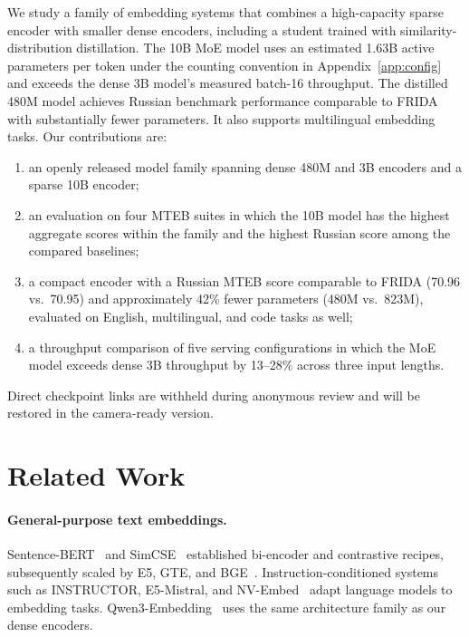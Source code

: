 \documentclass[11pt]{article}
\begin{document}
We study a family of embedding systems that combines a high-capacity sparse encoder with smaller dense encoders, including a student trained with similarity-distribution distillation.
The 10B MoE model uses an estimated 1.63B active parameters per token under the counting convention in Appendix~\ref{app:config} and exceeds the dense 3B model's measured batch-16 throughput.
The distilled 480M model achieves Russian benchmark performance comparable to FRIDA with substantially fewer parameters.
It also supports multilingual embedding tasks.
Our contributions are:
\begin{enumerate}
  \item an openly released model family spanning dense 480M and 3B encoders and a sparse 10B encoder;
  \item an evaluation on four MTEB suites in which the 10B model has the highest aggregate scores within the family and the highest Russian score among the compared baselines;
  \item a compact encoder with a Russian MTEB score comparable to FRIDA (70.96 vs.\ 70.95) and approximately 42\% fewer parameters (480M vs.\ 823M), evaluated on English, multilingual, and code tasks as well;
  \item a throughput comparison of five serving configurations in which the MoE model exceeds dense 3B throughput by 13--28\% across three input lengths.
\end{enumerate}
Direct checkpoint links are withheld during anonymous review and will be restored in the camera-ready version.

\section{Related Work}
\label{sec:related}

\paragraph{General-purpose text embeddings.}
Sentence-BERT~\citep{reimers2019sentence} and SimCSE~\citep{gao2021simcse} established bi-encoder and contrastive recipes, subsequently scaled by E5, GTE, and BGE~\citep{wang2022text,li2023towards,xiao2023cpack}.
Instruction-conditioned systems such as INSTRUCTOR, E5-Mistral, and NV-Embed~\citep{su2023instructor,wang2024improving,lee2025nvembed} adapt language models to embedding tasks.
Qwen3-Embedding~\citep{zhang2025qwen3embedding} uses the same architecture family as our dense encoders.
\end{document}

